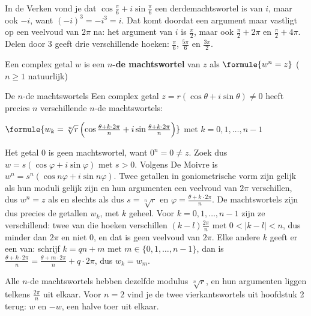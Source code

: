 In de Verken vond je dat $\cos\frac{\pi}{6} + i\sin\frac{\pi}{6}$ een derdemachtswortel is van $i$, maar ook $-i$, want $(-i)^3 = -i^3 = i$. Dat komt doordat een argument maar vastligt op een veelvoud van $2\pi$ na: het argument van $i$ is $\frac{\pi}{2}$, maar ook $\frac{\pi}{2} + 2\pi$ en $\frac{\pi}{2} + 4\pi$. Delen door 3 geeft drie verschillende hoeken: $\frac{\pi}{6}$, $\frac{5\pi}{6}$ en $\frac{3\pi}{2}$.

\begin{theorie}
Een complex getal $w$ is een \textbf{\textcolor{accent}{$n$-de machtswortel}} van $z$ als \quad $\formule{w^n = z}$ \qquad ($n \geqslant 1$ natuurlijk)

\begin{stelling}{De $n$-de machtswortels}
Een complex getal $z = r(\cos\theta + i\sin\theta) \neq 0$ heeft precies $n$ verschillende $n$-de machtswortels:

\vspace{1mm}
\qquad $\formule{w_k = \sqrt[n]{r}\,\Bigl(\cos\frac{\theta + k \cdot 2\pi}{n} + i\sin\frac{\theta + k \cdot 2\pi}{n}\Bigr)}$ \qquad met $k = 0, 1, \ldots, n - 1$
\end{stelling}

\begin{bewijs}
Het getal 0 is geen machtswortel, want $0^n = 0 \neq z$. Zoek dus $w = s(\cos\varphi + i\sin\varphi)$ met $s > 0$. Volgens De Moivre is $w^n = s^n(\cos n\varphi + i\sin n\varphi)$. Twee getallen in goniometrische vorm zijn gelijk als hun moduli gelijk zijn en hun argumenten een veelvoud van $2\pi$ verschillen, dus $w^n = z$ als en slechts als
dus $s = \sqrt[n]{r}$ en $\varphi = \frac{\theta + k \cdot 2\pi}{n}$. De machtswortels zijn dus precies de getallen $w_k$, met $k$ geheel. Voor $k = 0, 1, \ldots, n - 1$ zijn ze verschillend: twee van die hoeken verschillen $(k - l)\frac{2\pi}{n}$ met $0 < |k - l| < n$, dus minder dan $2\pi$ en niet 0, en dat is geen veelvoud van $2\pi$. Elke andere $k$ geeft er een van: schrijf $k = qn + m$ met $m \in \{0, 1, \ldots, n - 1\}$, dan is $\frac{\theta + k \cdot 2\pi}{n} = \frac{\theta + m \cdot 2\pi}{n} + q \cdot 2\pi$, dus $w_k = w_m$.
\end{bewijs}
\end{theorie}

Alle $n$-de machtswortels hebben dezelfde modulus $\sqrt[n]{r}$, en hun argumenten liggen telkens $\frac{2\pi}{n}$ uit elkaar. Voor $n = 2$ vind je de twee vierkantswortels uit hoofdstuk 2 terug: $w$ en $-w$, een halve toer uit elkaar.

